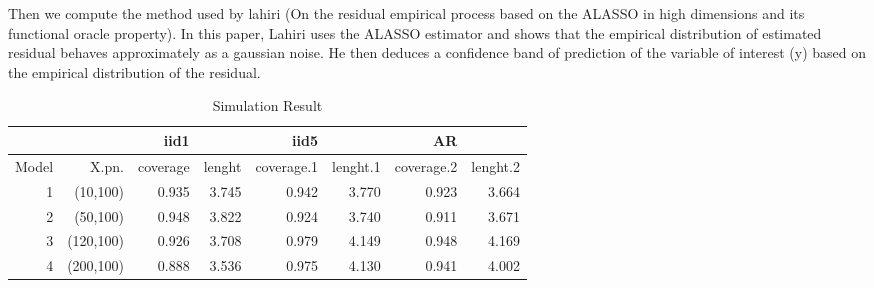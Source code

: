 \documentclass[11pt,oneside, a4paper]{amsart}\usepackage[]{graphicx}\usepackage[]{color}
\begin{document}
\begin{table}[ht]
\centering
\caption{Simulation Result} 
\label{Test_table}
{\footnotesize
{}
}
\end{table}





Then we compute the method used by lahiri (On the residual empirical process based on the ALASSO in high dimensions and its functional oracle property). In this paper, Lahiri uses the ALASSO estimator and shows that the empirical distribution of estimated residual behaves approximately as a gaussian noise. He then deduces a confidence band of prediction of the variable of interest (y) based on the empirical distribution of the residual.




\begin{table}[ht]
\centering
\caption{Simulation Result} 
\label{Test_table}
{\footnotesize
\begin{tabular}{|r|r|rr|rr|rr|}
  \toprule 
    &  & iid1 &  & iid5 & & AR & \\
 \midrule 
Model & X.pn. & coverage & lenght & coverage.1 & lenght.1 & coverage.2 & lenght.2 \\ 
    1 & (10,100) & 0.935 & 3.745 & 0.942 & 3.770 & 0.923 & 3.664 \\ 
     2 & (50,100) & 0.948 & 3.822 & 0.924 & 3.740 & 0.911 & 3.671 \\ 
     3 & (120,100) & 0.926 & 3.708 & 0.979 & 4.149 & 0.948 & 4.169 \\ 
     4 & (200,100) & 0.888 & 3.536 & 0.975 & 4.130 & 0.941 & 4.002 \\ 
   \bottomrule 
\end{tabular}
}
\end{table}
\end{document}
